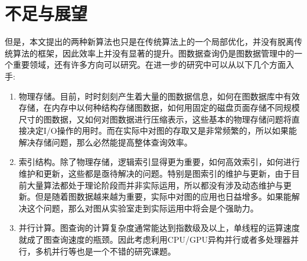 \documentclass{XDBAthesis}
\begin{document}
\section{不足与展望}
但是，本文提出的两种新算法也只是在传统算法上的一个局部优化，并没有脱离传统算法的框架，因此效率上并没有显著的提升。图数据查询仍是图数据管理中的一个重要领域，还有许多方向可以研究。在进一步的研究中可以从以下几个方面入手:
\begin{enumerate}
    \item 物理存储。目前，时时刻刻产生着大量的图数据信息，如何在图数据库中有效存储，在内存中以何种结构存储图数据，如何用固定的磁盘页面存储不同规模尺寸的图数据，又如何对图数据进行压缩表示，这些基本的物理存储问题将直接决定I/O操作的用时。而在实际中对图的存取又是非常频繁的，所以如果能解决存储问题，那么必然能提高整体查询效率。
    \item 索引结构。除了物理存储，逻辑索引显得更为重要，如何高效索引，如何进行维护和更新，这些都是亟待解决的问题。特别是图索引的维护与更新，由于目前大量算法都处于理论阶段而并非实际运用，所以都没有涉及动态维护与更新。但是随着图数据越来越为重要，实际中对图的应用也日益增多。如果能解决这个问题，那么对图从实验室走到实际运用中将会是个强助力。
    \item 并行计算。图查询的计算复杂度通常能达到指数级及以上，单线程的运算速度就成了图查询速度的瓶颈。因此考虑利用CPU/GPU异构并行或者多处理器并行，多机并行等也是一个不错的研究课题。
\end{enumerate}


\ifx\allfiles\undefined
%

\end{document}
